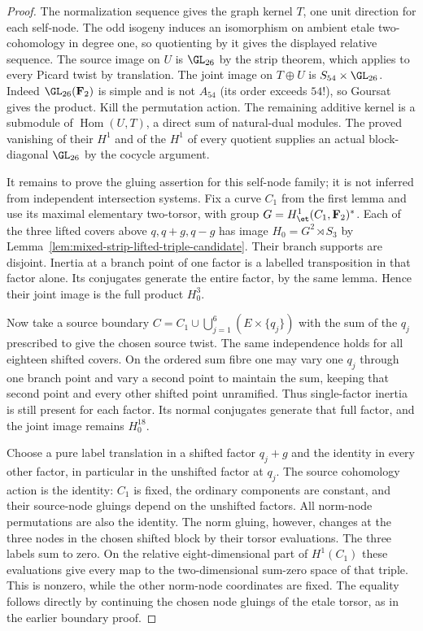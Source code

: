\begin{proof}
The normalization sequence gives the graph kernel $T$, one
unit direction for each self-node. The odd isogeny induces an
isomorphism on ambient etale two-cohomology in degree one,
so quotienting by it gives the displayed relative sequence.
The source image on $U$ is $\GL_{26}$ by the strip theorem,
which applies to every Picard twist by translation.
The joint image on $T\oplus U$ is $S_{54}\times\GL_{26}$.
Indeed $\GL_{26}(\mathbf F_2)$ is simple and is not $A_{54}$
(its order exceeds $54!$), so Goursat gives the product.
Kill the permutation action. The remaining additive kernel
is a submodule of $\operatorname{Hom}(U,T)$, a direct sum
of natural-dual modules. The proved vanishing of their $H^1$
and of the $H^1$ of every quotient supplies an actual
block-diagonal $\GL_{26}$ by the cocycle argument.

It remains to prove the gluing assertion for this self-node
family; it is not inferred from independent intersection
systems. Fix a curve $C_1$ from the first lemma and use its
maximal elementary two-torsor, with group
$G=H^1_{\et}(C_1,\mathbf F_2)^*$.
Each of the three lifted covers above $q,q+g,q-g$ has image
$H_0=G^2\rtimes S_3$ by
Lemma~\ref{lem:mixed-strip-lifted-triple-candidate}.
Their branch supports are disjoint. Inertia at a branch point
of one factor is a labelled transposition in that factor alone.
Its conjugates generate the entire factor, by the same lemma.
Hence their joint image is the full product $H_0^3$.

Now take a source boundary
$C=C_1\cup\bigcup_{j=1}^6(E\times\{q_j\})$ with the sum
of the $q_j$ prescribed to give the chosen source twist.
The same independence holds for all eighteen shifted covers.
On the ordered sum fibre one may vary one $q_j$ through one
branch point and vary a second point to maintain the sum,
keeping that second point and every other shifted point
unramified. Thus single-factor inertia is still present for
each factor. Its normal conjugates generate that full factor,
and the joint image remains $H_0^{18}$.

Choose a pure label translation in a shifted factor
$q_j+g$ and the identity in every other factor, in particular
in the unshifted factor at $q_j$. The source cohomology action
is the identity: $C_1$ is fixed, the ordinary components are
constant, and their source-node gluings depend on the unshifted
factors. All norm-node permutations are also the identity.
The norm gluing, however, changes at the three nodes in the
chosen shifted block by their torsor evaluations. The three
labels sum to zero. On the relative eight-dimensional part
of $H^1(C_1)$ these evaluations give every map to the
two-dimensional sum-zero space of that triple. This is
nonzero, while the other norm-node coordinates are fixed.
The equality follows directly by continuing the chosen node
gluings of the etale torsor, as in the earlier boundary proof.


\end{proof}
